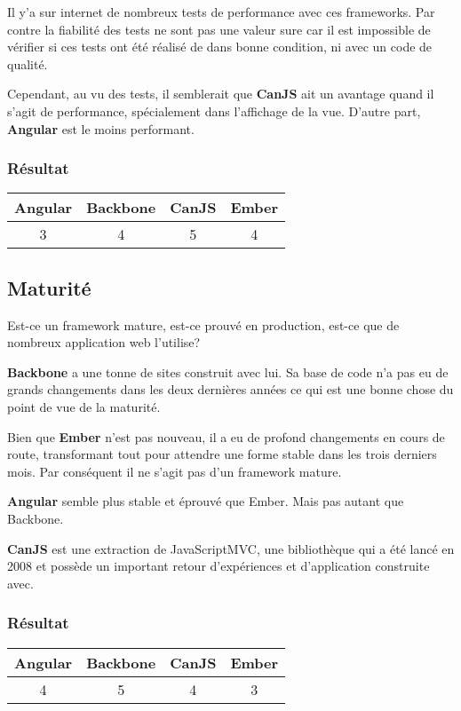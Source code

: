 Il y’a sur internet de nombreux tests de performance avec ces frameworks. Par contre la fiabilité des tests ne sont pas une valeur sure car il est impossible de vérifier si ces tests ont été réalisé de dans bonne condition, ni avec un code de qualité.

Cependant, au vu des tests, il semblerait que \textbf{CanJS} ait un avantage quand il s’agit de performance, spécialement dans l’affichage de la vue. D’autre part, \textbf{Angular} est le moins performant.

\subsubsection{Résultat}
\begin{tabular}{|c|c|c|c|}
  \hline 
  Angular & Backbone & CanJS & Ember \\
  \hline 
  3 & 4 & 5 & 4 \\
  \hline
\end{tabular}


\subsection{Maturité}

Est-ce un framework mature, est-ce prouvé en production, est-ce que de nombreux application web l’utilise?

\textbf{Backbone} a une tonne de sites construit avec lui. Sa base de code n’a pas eu de grands changements dans les deux dernières années ce qui est une bonne chose du point de vue de la maturité.

Bien que \textbf{Ember} n’est pas nouveau, il a eu de profond changements en cours de route, transformant tout pour attendre une forme stable dans les trois derniers mois. Par conséquent il ne s’agit pas d’un framework mature.

\textbf{Angular} semble plus stable et éprouvé que Ember. Mais pas autant que Backbone.

\textbf{CanJS} est une extraction de JavaScriptMVC, une bibliothèque qui a été lancé en 2008 et possède un important retour d’expériences et d’application construite avec.


\subsubsection{Résultat}
\begin{tabular}{|c|c|c|c|}
  \hline 
  Angular & Backbone & CanJS & Ember \\
  \hline 
  4 & 5 & 4 & 3 \\
  \hline
\end{tabular}



